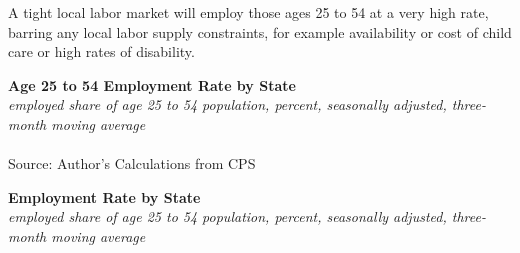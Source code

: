 \documentclass{report}
\begin{document}
{\begin{minipage}{0.76\textwidth}
\small A tight local labor market will employ those ages 25 to 54 at a very high rate, barring any local labor supply constraints, for example availability or cost of child care or high rates of disability. 


\end{minipage}

\normalsize \textbf{Age 25 to 54 Employment Rate by State}\\
\footnotesize{\textit{employed share of age 25 to 54 population, percent, seasonally adjusted, three-month moving average}}\\
\vspace{-3mm}
\hspace{-9mm}  \\
\footnotesize{Source: Author's Calculations from CPS}
\vspace{3mm}

\normalsize \textbf{Employment Rate by State}\\
\footnotesize{\textit{employed share of age 25 to 54 population, percent, seasonally adjusted, three-month moving average}}
\vspace{-2mm}

}
\end{document}
